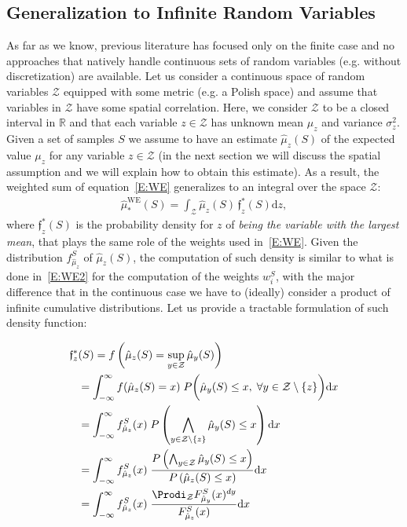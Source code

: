 \subsection{Generalization to Infinite Random Variables}\label{S:infinite}
As far as we know, previous literature has focused only on the finite case and no approaches that natively handle continuous sets of random variables (e.g. without discretization) are available.
Let us consider a continuous space of random variables $\mathcal{Z}$ equipped with some metric (e.g. a Polish space) and assume that variables in $\mathcal{Z}$ have some spatial correlation.
Here, we consider $\mathcal{Z}$ to be a closed interval in $\mathbb{R}$ and that each variable $z \in \mathcal{Z}$ has unknown mean $\mu_z$ and variance $\sigma^2_z$.
Given a set of samples $S$ we assume to have an estimate $\hat{\mu}_z(S)$ of the expected value $\mu_z$ for any variable $z \in \mathcal{Z}$ (in the next section we will discuss the spatial assumption and we will explain how to obtain this estimate).
As a result, the weighted sum of equation~\ref{E:WE} generalizes to an integral over the space $\mathcal{Z}$:
\begin{align}\label{E:continuousWE}
\hat{\mu}_*^{\textrm{WE}}(S) = \int_{\mathcal{Z}} \hat{\mu}_z(S) \, 
\mathfrak{f}_z^*(S) \mathrm{d}z ,
\end{align}
where $\mathfrak{f}_z^*(S)$ 
is the probability density for $z$ of \emph{being the variable with the largest mean}, that plays the same role of the weights used in~\ref{E:WE}.
Given the distribution $f_{\hat{\mu}_z}^S$ of $\hat{\mu}_z(S)$, the computation of such density is similar to what is done in~\ref{E:WE2} for the computation of the weights $w_i^S$, with the major difference that in the continuous case we have to (ideally) consider a product of infinite cumulative distributions.
Let us provide a tractable formulation of such density function:

\begin{small}
\begin{align}
\nonumber \mathfrak{f}_z^*&(S) = f\left(\hat{\mu}_z(S) = \sup_{y \in \mathcal{Z}} \hat{\mu}_y(S)\right)\\
\nonumber &= \int_{-\infty}^{\infty}f(\hat{\mu}_z(S) = x) \; P \bigg( \hat{\mu}_y(S) \leq x, \; \forall y \in \mathcal{Z} \setminus \{z\} \bigg) \mathrm{d}x \\
\label{E:probability_events}
&= \int_{-\infty}^{\infty} f_{\hat{\mu}_z}^S(x) \; P \left( \bigwedge_{y \in \mathcal{Z} \setminus \{z\}} \hat{\mu}_y(S) \leq x \right) \mathrm{d}x \\
\label{E:probability_division}
&= \int_{-\infty}^{\infty} f_{\hat{\mu}_z}^S(x) \; \frac{P \left( \bigwedge_{y \in \mathcal{Z}} \hat{\mu}_y(S) \leq x \right)}{P \left( \hat{\mu}_{z}(S) \leq x \right)} \mathrm{d}x \\
\nonumber &= \int_{-\infty}^{\infty} f_{\hat{\mu}_z}^S(x) \; \frac{\Prodi_{\mathcal{Z}} F_{\hat{\mu}_y}^S(x)^{dy}}{F_{\hat{\mu}_z}^S(x)}\mathrm{d}x
\end{align}
\end{small}

